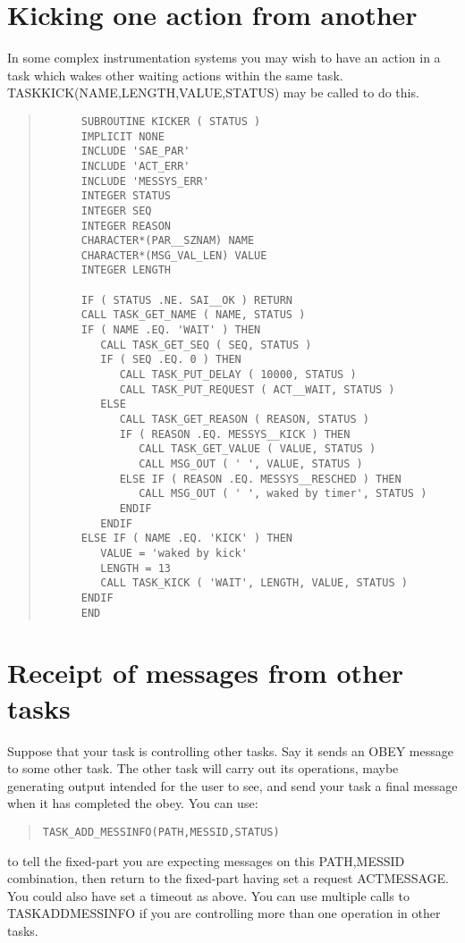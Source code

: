 \documentclass[twoside,11pt]{article}
\newcommand{\xlabel}[1]{}
\renewcommand{\_}{\texttt{\symbol{95}}}
\begin{document}
\section{Kicking one action from another
\xlabel{kicking_one_action_from_another}}

In some complex instrumentation systems you may wish to have an action in a
task which wakes other waiting actions within the same task.
TASK\_KICK(NAME,LENGTH,VALUE,STATUS) may be called to do this.

\small \begin{quote} \begin{verbatim}
      SUBROUTINE KICKER ( STATUS )
      IMPLICIT NONE
      INCLUDE 'SAE_PAR'
      INCLUDE 'ACT_ERR'
      INCLUDE 'MESSYS_ERR'
      INTEGER STATUS
      INTEGER SEQ
      INTEGER REASON
      CHARACTER*(PAR__SZNAM) NAME
      CHARACTER*(MSG_VAL_LEN) VALUE
      INTEGER LENGTH

      IF ( STATUS .NE. SAI__OK ) RETURN
      CALL TASK_GET_NAME ( NAME, STATUS )
      IF ( NAME .EQ. 'WAIT' ) THEN
         CALL TASK_GET_SEQ ( SEQ, STATUS )
         IF ( SEQ .EQ. 0 ) THEN
            CALL TASK_PUT_DELAY ( 10000, STATUS )
            CALL TASK_PUT_REQUEST ( ACT__WAIT, STATUS )
         ELSE
            CALL TASK_GET_REASON ( REASON, STATUS )
            IF ( REASON .EQ. MESSYS__KICK ) THEN
               CALL TASK_GET_VALUE ( VALUE, STATUS )
               CALL MSG_OUT ( ' ', VALUE, STATUS )
            ELSE IF ( REASON .EQ. MESSYS__RESCHED ) THEN
               CALL MSG_OUT ( ' ', waked by timer', STATUS )
            ENDIF
         ENDIF
      ELSE IF ( NAME .EQ. 'KICK' ) THEN
         VALUE = 'waked by kick'
         LENGTH = 13
         CALL TASK_KICK ( 'WAIT', LENGTH, VALUE, STATUS )
      ENDIF
      END
\end{verbatim} \end{quote} \normalsize

\section{Receipt of messages from other tasks
\xlabel{receipt_of_messages_from_other_tasks}}

Suppose that your task is controlling other tasks. Say it sends an OBEY
message to some other task. The other task will carry out its
operations, maybe generating output intended for the user to see, and
send your task a final message when it has completed the obey. You can
use:
\small \begin{quote} \begin{verbatim}
TASK_ADD_MESSINFO(PATH,MESSID,STATUS)
\end{verbatim} \end{quote} \normalsize
to tell the fixed-part you are
expecting messages on this PATH,MESSID combination, then return to the
fixed-part having set a request ACT\_\_MESSAGE. You could also have set a
timeout as above. You can use multiple calls to TASK\_ADD\_MESSINFO if you
are controlling more than one operation in other tasks.
\end{document}
